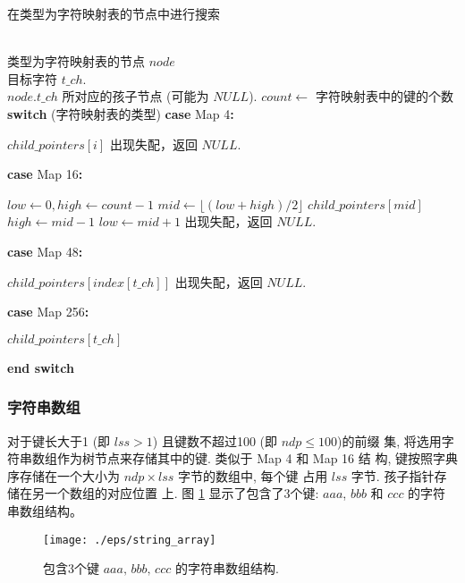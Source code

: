 \documentclass{ws-ijprai}
\makeatletter
\newcommand{\SWITCH}[1]{\STATE \textbf{switch} (#1)}
\newcommand{\ENDPWITCH}{\STATE \textbf{end switch}}
\newcommand{\CASE}[1]{\STATE \textbf{case} #1\textbf{:} \begin{ALC@g}}
\newcommand{\ENDCASE}{\end{ALC@g}}
\makeatother
\begin{document}
\begin{algorithm}
  \caption{在类型为字符映射表的节点中进行搜索}\scriptsize
  \label{alg:character map}
  \begin{algorithmic}[1]
    \REQUIRE ~~\\
    类型为字符映射表的节点 $node$\\
    目标字符 $t\_ch$.
    \ENSURE ~~\\
     $node.t\_ch$ 所对应的孩子节点 (可能为 $NULL$).
    \STATE
    \STATE $count \leftarrow$ 字符映射表中的键的个数
    \STATE
    \SWITCH{字符映射表的类型}
    \CASE{\textsf{Map 4}}
    \RETURN $child\_pointers[i]$
    \ENDIF
    \ENDFOR
    \STATE 出现失配，返回 $NULL$.
    \ENDCASE
    \STATE
    \CASE{\textsf{Map 16}}
    \STATE $low \leftarrow 0, high \leftarrow count-1$
    \STATE $mid \leftarrow \lfloor (low+high)/2 \rfloor$
    \RETURN $child\_pointers[mid]$
    \STATE $high \leftarrow mid-1$
    \ELSE
    \STATE $low \leftarrow mid+1$
    \ENDIF
    \ENDWHILE
    \STATE 出现失配，返回 $NULL$.
    \ENDCASE
    \STATE
    \CASE{\textsf{Map 48}}
    \RETURN $child\_pointers[index[t\_ch]]$
    \ELSE
    \STATE 出现失配，返回 $NULL$.
    \ENDIF
    \ENDCASE
    \STATE
    \CASE{\textsf{Map 256}}
    \RETURN $child\_pointers[t\_ch]$
    \ENDCASE
    \ENDPWITCH
  \end{algorithmic}
\end{algorithm}

\subsubsection{字符串数组}
\label{sec:string array}

对于键长大于1 (即 $lss > 1$) 且键数不超过100 (即 $ndp \leq 100$)的前缀
集, 将选用字符串数组作为树节点来存储其中的键. 类似于 Map 4 和 Map 16 结
构, 键按照字典序存储在一个大小为 $ndp \times lss$ 字节的数组中, 每个键
占用 $lss$ 字节. 孩子指针存储在另一个数组的对应位置
上. 图 \ref{fig:string array} 显示了包含了3个键: $aaa$, $bbb$ 和 $ccc$
的字符串数组结构。

\begin{figure}[htbp]
  \centering
  \texttt{[image: ./eps/string\_array]}
  \caption{包含3个键 $aaa,\, bbb,\, ccc$ 的字符串数组结构.}
  \label{fig:string array}
\end{figure}
\end{document}
